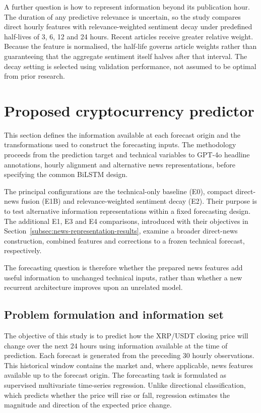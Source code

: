 A further question is how to represent information beyond its publication hour. The duration of any predictive relevance is uncertain, so the study compares direct hourly features with relevance-weighted sentiment decay under predefined half-lives of 3, 6, 12 and 24 hours. Recent articles receive greater relative weight. Because the feature is normalised, the half-life governs article weights rather than guaranteeing that the aggregate sentiment itself halves after that interval. The decay setting is selected using validation performance, not assumed to be optimal from prior research.


\section{Proposed cryptocurrency predictor}
\label{sec:method}

This section defines the information available at each forecast origin and the transformations used to construct the forecasting inputs. The methodology proceeds from the prediction target and technical variables to GPT-4o headline annotations, hourly alignment and alternative news representations, before specifying the common BiLSTM design.

The principal configurations are the technical-only baseline (E0), compact direct-news fusion (E1B) and relevance-weighted sentiment decay (E2). Their purpose is to test alternative information representations within a fixed forecasting design. The additional E1, E3 and E4 comparisons, introduced with their objectives in Section~\ref{subsec:news-representation-results}, examine a broader direct-news construction, combined features and corrections to a frozen technical forecast, respectively.

The forecasting question is therefore whether the prepared news features add useful information to unchanged technical inputs, rather than whether a new recurrent architecture improves upon an unrelated model.

\subsection{Problem formulation and information set}
\label{sec:method_problem}

The objective of this study is to predict how the XRP/USDT closing price will change over the next 24 hours using information available at the time of prediction. Each forecast is generated from the preceding 30 hourly observations. This historical window contains the market and, where applicable, news features available up to the forecast origin. The forecasting task is formulated as supervised multivariate time-series regression. Unlike directional classification, which predicts whether the price will rise or fall, regression estimates the magnitude and direction of the expected price change.

